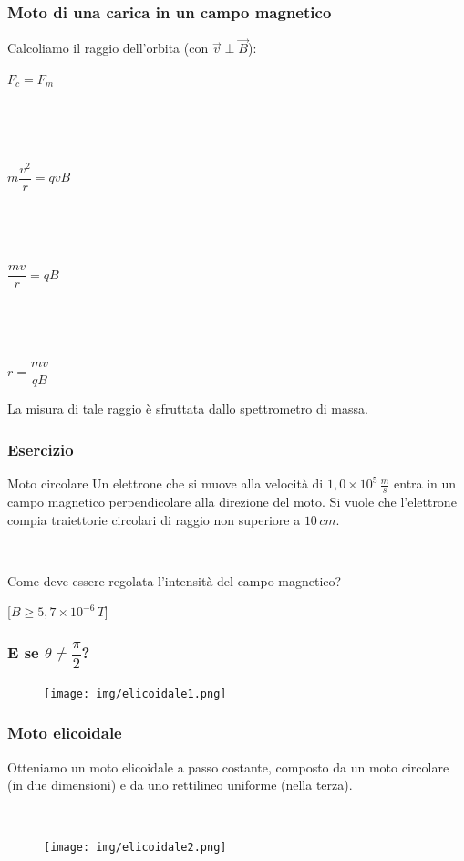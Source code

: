 \documentclass[]{beamer}
\theoremstyle{plain}
\begin{document}
\begin{frame}
\frametitle{Moto di una carica in un campo magnetico}
Calcoliamo il raggio dell'orbita (con $ \vec{v} \perp \vec{B} $):
\begin{center}
$ F_c = F_m $\pause

~

~

$ m\dfrac{v^2}{r} = qvB $\pause

~

~

$ \dfrac{mv}{r} = qB $\pause

~

~

\colorbox{blue!30}{$ r = \dfrac{mv}{qB} $}\pause
\end{center}
La misura di tale raggio è sfruttata dallo \alert{spettrometro di massa}.
\end{frame}


\begin{frame}
\frametitle{Esercizio}
\begin{exampleblock}{Moto circolare}
  Un elettrone che si muove alla velocità di $ 1,0 \times 10^{5} \, \frac{m}{s} $ entra in un campo magnetico perpendicolare alla direzione del moto. Si vuole che l'elettrone compia traiettorie circolari di raggio non superiore a $ 10 \, cm $.

  ~

  Come deve essere regolata l'intensità del campo magnetico?
  
  \hspace{\fill}[$ B \geq 5,7 \times 10^{-6} \, T $]
\end{exampleblock} 
\end{frame}

\begin{frame}
\frametitle{E se $ \theta \neq \dfrac{\pi}{2} $?}
\begin{figure}
\texttt{[image: img/elicoidale1.png]}
\end{figure}
\end{frame}


\begin{frame}
\frametitle{Moto elicoidale}
Otteniamo un moto elicoidale a passo costante, composto da un moto circolare (in due dimensioni) e da uno rettilineo uniforme (nella terza).

~

\begin{figure}
\texttt{[image: img/elicoidale2.png]}
\end{figure}
\end{frame}
\end{document}
